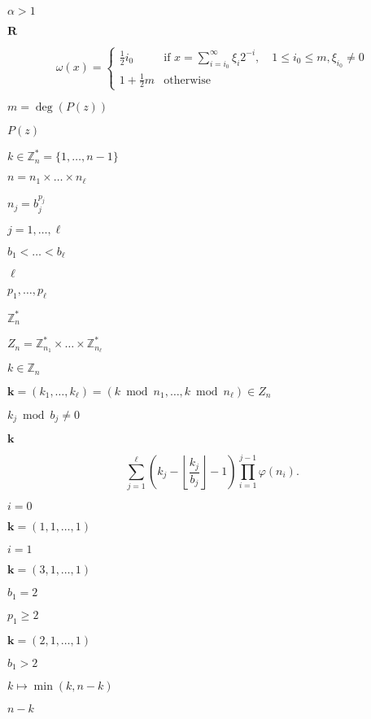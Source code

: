 \documentclass{article}
\begin{document}
$\alpha >1$
\pagebreak

$\textbf{R}$
\pagebreak

\[   \omega(x) =
   \left\{
   \begin{array}{ll}
      \frac{1}{2}i_{0} & \mbox{if } x = \sum_{i=i_{0}}^{\infty} \xi_{i}2^{-i},\quad 1 \leq i_{0} \leq m,  \xi_{i_{0}} \neq 0 \\
       1+\frac{1}{2}m & \text{otherwise } 
     \end{array} \right.
\]
\pagebreak

$m = \deg(P(z))$
\pagebreak

$P(z)$
\pagebreak

$k \in \mathbb
 Z_n^* = \{1,\dots,n-1\}$
\pagebreak

$n = n_1 \times \dots \times n_\ell$
\pagebreak

$n_j = b_j^{p_j}$
\pagebreak

$j=1,\dots,\ell$
\pagebreak

$b_1 < \dots < b_\ell$
\pagebreak

$\ell$
\pagebreak

$p_1,\dots,p_\ell$
\pagebreak

$\mathbb Z_n^*$
\pagebreak

$Z_n = \mathbb Z_{n_1}^* \times
 \dots \times \mathbb Z_{n_\ell}^*$
\pagebreak

$k \in \mathbb Z_n$
\pagebreak

$\boldsymbol k = (k_1, \dots, k_\ell) = (k \bmod n_1, \dots, k \bmod
 n_\ell) \in Z_n$
\pagebreak

$k_j \bmod b_j \neq 0$
\pagebreak

$\boldsymbol k$
\pagebreak

\[   \sum_{j=1}^\ell \left(
       k_j - \left\lfloor \frac{k_j}{b_j} \right\rfloor - 1
    \right)
    \prod_{i=1}^{j-1} \varphi(n_i).
\]
\pagebreak

$i=0$
\pagebreak

$\boldsymbol k = (1, 1, \dots, 1)$
\pagebreak

$i=1$
\pagebreak

$\boldsymbol k = (3, 1, \dots, 1)$
\pagebreak

$b_1 = 2$
\pagebreak

$p_1 \geq 2$
\pagebreak

$\boldsymbol k = (2, 1, \dots, 1)$
\pagebreak

$b_1 >
2$
\pagebreak

$k \mapsto \min(k, n-k)$
\pagebreak

$n-k$
\pagebreak
\end{document}
